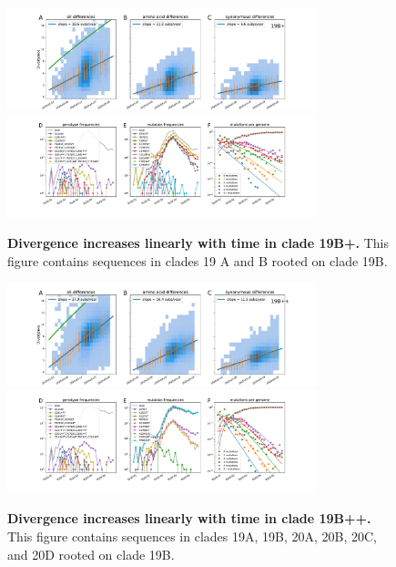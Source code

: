 \begin{figure}[h]
    \includegraphics[width=0.8\textwidth]{figures/rtt/19B+_rtt.pdf}
    \includegraphics[width=0.8\textwidth]{figures/counts/19B+_counts.pdf}
    \caption{{\bf Divergence increases linearly with time in clade 19B+.}
    This figure contains sequences in clades 19 A and B rooted on clade 19B.
    \label{fig:19B+_divergence}}
\end{figure}

\begin{figure}[h]
    \includegraphics[width=0.8\textwidth]{figures/rtt/19B++_rtt.pdf}
    \includegraphics[width=0.8\textwidth]{figures/counts/19B++_counts.pdf}
    \caption{{\bf Divergence increases linearly with time in clade 19B++.}
    This figure contains sequences in clades 19A, 19B, 20A, 20B, 20C, and 20D rooted on clade 19B.
    \label{fig:19B++_divergence}}
\end{figure}

